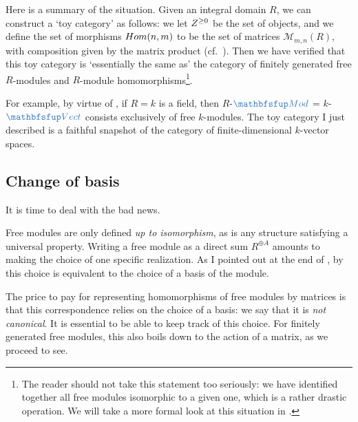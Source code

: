 Here is a summary of the situation. Given an integral domain $R$, we
can construct a `toy category' as follows: we let $Z^{\geq 0}$ be the
set of objects, and we define the set of morphisms $Hom(n,m)$ to be
the set of matrices $\mathcal{M}_{m,n}(R)$, with composition given by
the matrix product (cf.\ ). Then we
have verified that this toy category is `essentially the same as' the
category of finitely generated free $R$-modules and $R$-module
homomorphisms\footnote{The reader should not take this statement too
  seriously: we have identified together all free modules isomorphic
  to a given one, which is a rather drastic operation. We will take a
  more formal look at this situation in .}.

For example, by virtue of , if $R = k$ is a field,
then $R$-$\categ{Mod}$ = $k$-$\categ{Vect}$ consists exclusively of
free $k$-modules. The toy category I just described is a faithful
snapshot of the category of finite-dimensional $k$-vector spaces.

\subsection{Change of basis}
\label{subsec:linalg:change-of-basis}
It is time to deal with the bad news.

Free modules are only defined \emph{up to isomorphism}, as is any
structure satisfying a universal property. Writing a free module as a
direct sum $R^{\oplus A}$ amounts to making the choice of one specific
realization. As I pointed out at the end of
, by
 this choice is equivalent to the choice of a basis
of the module.

The price to pay for representing homomorphisms of free modules by
matrices is that this correspondence relies on the choice of a basis:
we say that it is \emph{not canonical}. It is essential to be able to
keep track of this choice. For finitely generated free modules, this
also boils down to the action of a matrix, as we proceed to see.

